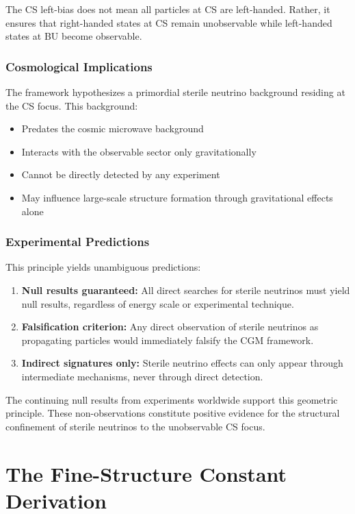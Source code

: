 \documentclass[11pt,a4paper]{article}
\theoremstyle{definition}
\theoremstyle{remark}
\begin{document}
The CS left-bias does not mean all particles at CS are left-handed. Rather, it ensures that right-handed states at CS remain unobservable while left-handed states at BU become observable.

\subsubsection{Cosmological Implications}

The framework hypothesizes a primordial sterile neutrino background residing at the CS focus. This background:
\begin{itemize}
\item Predates the cosmic microwave background
\item Interacts with the observable sector only gravitationally
\item Cannot be directly detected by any experiment
\item May influence large-scale structure formation through gravitational effects alone
\end{itemize}

\subsubsection{Experimental Predictions}

This principle yields unambiguous predictions:
\begin{enumerate}
\item \textbf{Null results guaranteed:} All direct searches for sterile neutrinos must yield null results, regardless of energy scale or experimental technique.
\item \textbf{Falsification criterion:} Any direct observation of sterile neutrinos as propagating particles would immediately falsify the CGM framework.
\item \textbf{Indirect signatures only:} Sterile neutrino effects can only appear through intermediate mechanisms, never through direct detection.
\end{enumerate}

The continuing null results from experiments worldwide support this geometric principle. These non-observations constitute positive evidence for the structural confinement of sterile neutrinos to the unobservable CS focus.

\section{The Fine-Structure Constant Derivation}
\end{document}
